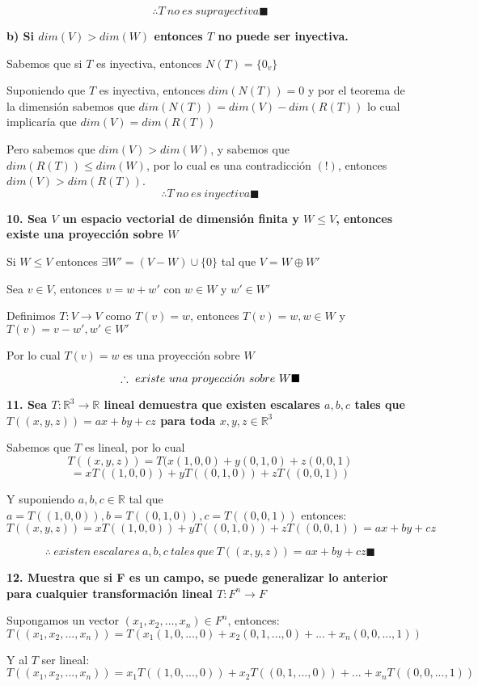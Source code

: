 \documentclass{article}
\begin{document}
$$\therefore T\ no\ es\ suprayectiva\blacksquare$$

\pagebreak
\textbf{b) Si $dim(V)>dim(W)$ entonces $T$ no puede ser inyectiva.}

Sabemos que si $T$ es inyectiva, entonces $N(T)=\{0_{v}\}$

Suponiendo que $T$ es inyectiva, entonces $dim(N(T))=0$ y por el teorema de la dimensión sabemos que $dim(N(T))=dim(V)-dim(R(T))$ lo cual implicaría que $dim(V)=dim(R(T))$

Pero sabemos que $dim(V)>dim(W)$, y sabemos que $dim(R(T))\leq dim(W)$, por lo cual es una contradicción $(!)$, entonces $dim(V)>dim(R(T))$.
$$\therefore T\ no\ es\ inyectiva\blacksquare$$

\textbf{10. Sea $V$ un espacio vectorial de dimensión finita y $W\leq V$, entonces existe una proyección sobre $W$}

Si $W\leq V$ entonces $\exists W'=(V-W)\cup\{0\}$ tal que $V=W\oplus W'$

Sea $v\in V$, entonces $v=w+w'$ con $w\in W$ y $w'\in W'$

Definimos $T:V\rightarrow V$ como $T(v)=w$, entonces $T(v)=w, w\in W$ y $T(v)=v-w', w'\in W'$

Por lo cual $T(v)=w$ es una proyección sobre $W$

$$\therefore\ existe\ una\ proyecci\Acute{o}n\ sobre\ W\blacksquare$$

\textbf{11. Sea $T: \mathbb{R}^3 \rightarrow \mathbb{R}$ lineal demuestra que existen escalares $a,b,c$ tales que $T((x,y,z))=ax+by+cz$ para toda $x,y,z \in \mathbb{R}^3$}

Sabemos que $T$ es lineal, por lo cual $$T((x,y,z))=T(x(1,0,0)+y(0,1,0)+z(0,0,1)$$
$$=xT((1,0,0))+yT((0,1,0))+zT((0,0,1))$$

Y suponiendo $a,b,c \in \mathbb{R}$ tal que $a=T((1,0,0)), b=T((0,1,0)), c=T((0,0,1))$ entonces: $$T((x,y,z))=xT((1,0,0))+yT((0,1,0))+zT((0,0,1))=ax+by+cz$$

$$\therefore\ existen\ escalares\ a,b,c\ tales\ que\ T((x,y,z))=ax+by+cz\blacksquare$$

\textbf{12. Muestra que si F es un campo, se puede generalizar lo anterior para cualquier transformación lineal $T: F^n \rightarrow F$}

Supongamos un vector $(x_1,x_2,...,x_n)\in F^n$, entonces: $$T((x_1,x_2,...,x_n))=T(x_1(1,0,...,0)+x_2(0,1,...,0)+...+x_n(0,0,...,1))$$

Y al $T$ ser lineal: $$T((x_1,x_2,...,x_n))=x_1T((1,0,...,0))+x_2T((0,1,...,0))+...+x_nT((0,0,...,1))$$
\end{document}
